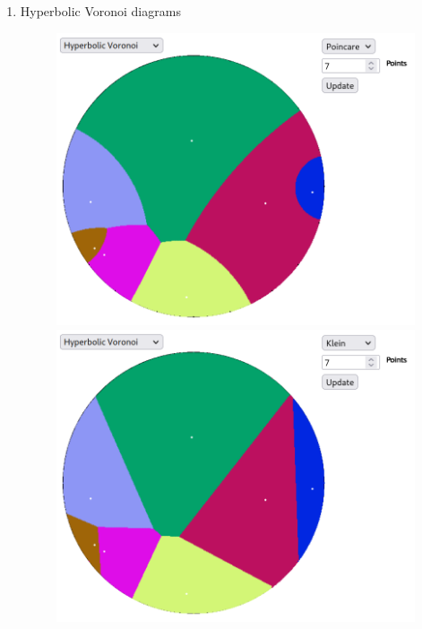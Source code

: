 \documentclass[12pt]{article}%
\begin{document}
\begin{enumerate}
\begin{figure}[H]
		\end{figure}
	\item Hyperbolic Voronoi diagrams
	\begin{figure}[H]
		\centering
		\includegraphics[scale=0.25]{p_voronoi_small.png}
		\includegraphics[scale=0.25]{k_voronoi_small.png}
	\end{figure}
	\begin{figure}[H]
		\centering

\end{figure}
\end{enumerate}
\end{document}
